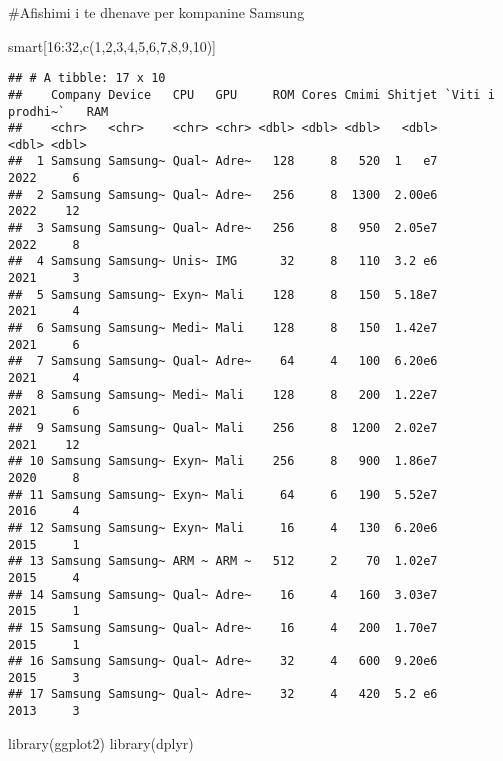 \documentclass[
]{article}
\newenvironment{Shaded}{\begin{snugshade}}{\end{snugshade}}
\newcommand{\DecValTok}[1]{\textcolor[rgb]{0.00,0.00,0.81}{#1}}
\newcommand{\FunctionTok}[1]{\textcolor[rgb]{0.00,0.00,0.00}{#1}}
\newcommand{\NormalTok}[1]{#1}
\newcommand{\SpecialCharTok}[1]{\textcolor[rgb]{0.00,0.00,0.00}{#1}}
\begin{document}
\#Afishimi i te dhenave per kompanine Samsung

\begin{Shaded}
\begin{Highlighting}[]
\NormalTok{smart[}\DecValTok{16}\SpecialCharTok{:}\DecValTok{32}\NormalTok{,}\FunctionTok{c}\NormalTok{(}\DecValTok{1}\NormalTok{,}\DecValTok{2}\NormalTok{,}\DecValTok{3}\NormalTok{,}\DecValTok{4}\NormalTok{,}\DecValTok{5}\NormalTok{,}\DecValTok{6}\NormalTok{,}\DecValTok{7}\NormalTok{,}\DecValTok{8}\NormalTok{,}\DecValTok{9}\NormalTok{,}\DecValTok{10}\NormalTok{)]}
\end{Highlighting}
\end{Shaded}

\begin{verbatim}
## # A tibble: 17 x 10
##    Company Device   CPU   GPU     ROM Cores Cmimi Shitjet `Viti i prodhi~`   RAM
##    <chr>   <chr>    <chr> <chr> <dbl> <dbl> <dbl>   <dbl>            <dbl> <dbl>
##  1 Samsung Samsung~ Qual~ Adre~   128     8   520  1   e7             2022     6
##  2 Samsung Samsung~ Qual~ Adre~   256     8  1300  2.00e6             2022    12
##  3 Samsung Samsung~ Qual~ Adre~   256     8   950  2.05e7             2022     8
##  4 Samsung Samsung~ Unis~ IMG      32     8   110  3.2 e6             2021     3
##  5 Samsung Samsung~ Exyn~ Mali    128     8   150  5.18e7             2021     4
##  6 Samsung Samsung~ Medi~ Mali    128     8   150  1.42e7             2021     6
##  7 Samsung Samsung~ Qual~ Adre~    64     4   100  6.20e6             2021     4
##  8 Samsung Samsung~ Medi~ Mali    128     8   200  1.22e7             2021     6
##  9 Samsung Samsung~ Qual~ Mali    256     8  1200  2.02e7             2021    12
## 10 Samsung Samsung~ Exyn~ Mali    256     8   900  1.86e7             2020     8
## 11 Samsung Samsung~ Exyn~ Mali     64     6   190  5.52e7             2016     4
## 12 Samsung Samsung~ Exyn~ Mali     16     4   130  6.20e6             2015     1
## 13 Samsung Samsung~ ARM ~ ARM ~   512     2    70  1.02e7             2015     4
## 14 Samsung Samsung~ Qual~ Adre~    16     4   160  3.03e7             2015     1
## 15 Samsung Samsung~ Qual~ Adre~    16     4   200  1.70e7             2015     1
## 16 Samsung Samsung~ Qual~ Adre~    32     4   600  9.20e6             2015     3
## 17 Samsung Samsung~ Qual~ Adre~    32     4   420  5.2 e6             2013     3
\end{verbatim}

\begin{Shaded}
\begin{Highlighting}[]
\FunctionTok{library}\NormalTok{(ggplot2)}
\FunctionTok{library}\NormalTok{(dplyr)}
\end{Highlighting}
\end{Shaded}
\end{document}

